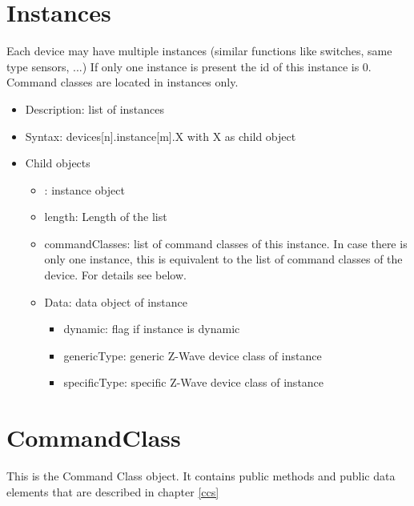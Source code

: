 \section{Instances}

Each device may have multiple instances (similar functions like switches, same type 
sensors, ...) If only one instance is present the id of this instance is 0. Command 
classes are located in instances only.

\begin {itemize}
\item Description: list of instances
\item Syntax:  devices[n].instance[m].X with X as child object
\item Child objects
\begin {itemize}
\item [m]: instance object
\item length: Length of the list
\item commandClasses: list of command classes of this instance. In case there is only one instance, this is equivalent to the list of command classes of the device. For details see below.
\item Data: data object of instance 
\begin {itemize}
\item dynamic: flag if instance is dynamic
\item genericType: generic Z-Wave device class of instance
\item specificType: specific Z-Wave device class of instance
\end {itemize}
\end {itemize}
\end {itemize}

\section{CommandClass}

This is the Command Class object. It contains public methods and public data elements that are described
in chapter \ref{ccs}


